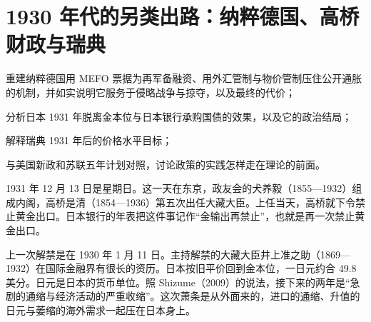 \chapter{1930 年代的另类出路：纳粹德国、高桥财政与瑞典}\label{ch:alternatives}

\begin{chapterguide}
\begin{guidegoals}
\item 重建纳粹德国用 MEFO 票据为再军备融资、用外汇管制与物价管制压住公开通胀的机制，并如实说明它服务于侵略战争与掠夺，以及最终的代价；
\item 分析日本 1931 年脱离金本位与日本银行承购国债的效果，以及它的政治结局；
\item 解释瑞典 1931 年后的价格水平目标；
\item 与美国新政和苏联五年计划对照，讨论政策的实践怎样走在理论的前面。
\end{guidegoals}
\end{chapterguide}

1931 年 12 月 13 日是星期日。这一天在东京，政友会的犬养毅（1855—1932）组成内阁，高桥是清（1854—1936）第五次出任大藏大臣\cite{shizume2009,ndl2026}。上任当天，高桥就下令禁止黄金出口\cite{shizume2009}。日本银行的年表把这件事记作“金输出再禁止”，也就是再一次禁止黄金出口\cite{bojchron}。

上一次解禁是在 1930 年 1 月 11 日\cite{ndl2026}。主持解禁的大藏大臣井上准之助（1869—1932）在国际金融界有很长的资历\cite{shizume2009,ndl2026}。日本按旧平价回到金本位，一日元约合 49.8 美分\cite{shizume2009}。日元是日本的货币单位。照 Shizume（2009）的说法，接下来的两年是“急剧的通缩与经济活动的严重收缩”\cite{shizume2009}。这次萧条是从外面来的，进口的通缩、升值的日元与萎缩的海外需求一起压在日本身上\cite{shizume2009}。

